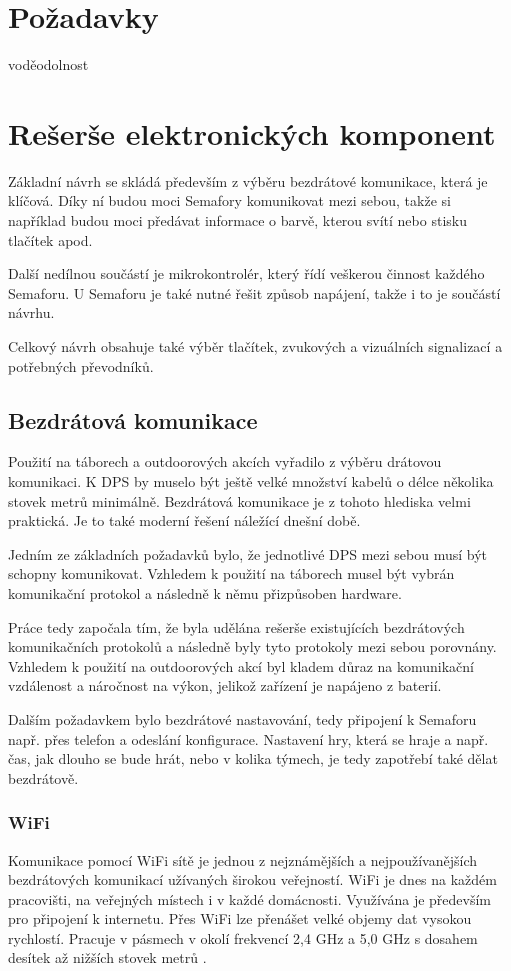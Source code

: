 \chapter{Požadavky}
voděodolnost


\chapter{Rešerše elektronických komponent}
Základní návrh se skládá především z výběru bezdrátové komunikace, která je klíčová. Díky ní budou moci Semafory komunikovat mezi 
sebou, takže si například budou moci předávat informace o barvě, kterou svítí nebo stisku tlačítek apod. 

Další nedílnou součástí je mikrokontrolér, který řídí veškerou činnost každého Semaforu. U Semaforu je také nutné řešit způsob napájení,
takže i to je součástí návrhu.

Celkový návrh obsahuje také výběr tlačítek, zvukových a vizuálních signalizací a potřebných převodníků. 


\section{Bezdrátová komunikace}
Použití na táborech a outdoorových akcích vyřadilo z výběru drátovou komunikaci. K DPS by muselo být ještě velké množství kabelů 
o délce několika stovek metrů minimálně. Bezdrátová komunikace je z tohoto hlediska velmi praktická. Je to také moderní řešení 
náležící dnešní době. 

Jedním ze základních požadavků bylo, že jednotlivé DPS mezi sebou musí být schopny komunikovat. Vzhledem k použití na táborech 
musel být vybrán komunikační protokol a následně k němu přizpůsoben hardware. 

Práce tedy započala tím, že byla udělána rešerše existujících bezdrátových komunikačních protokolů a následně byly tyto protokoly 
mezi sebou porovnány. Vzhledem k použití na outdoorových akcí byl kladem důraz na komunikační vzdálenost a náročnost na výkon, 
jelikož zařízení je napájeno z baterií. 

Dalším požadavkem bylo bezdrátové nastavování, tedy připojení k Semaforu např. přes telefon a odeslání konfigurace. Nastavení hry,
která se hraje a např. čas, jak dlouho se bude hrát, nebo v kolika týmech, je tedy zapotřebí také dělat bezdrátově. 

\subsection{WiFi}
Komunikace pomocí WiFi sítě je jednou z nejznámějších a nejpoužívanějších bezdrátových komunikací užívaných širokou veřejností. 
WiFi je dnes na každém pracovišti, na veřejných místech i v každé domácnosti. Využívána je především pro připojení k internetu. 
Přes WiFi lze přenášet velké objemy dat vysokou rychlostí. Pracuje v pásmech v okolí frekvencí 2,4 GHz a 5,0 GHz s dosahem 
desítek až nižších stovek metrů \cite{Bezdrat_muni}. 

